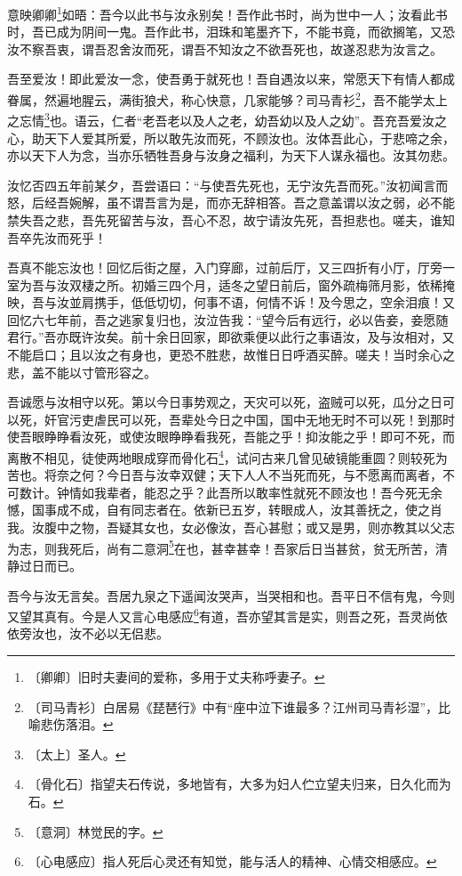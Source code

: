 \documentclass[12pt,UTF-8,openany]{ctexbook}
\begin{document}
\begin{normalsize}
    
    意映卿卿\footnote{〔卿卿〕旧时夫妻间的爱称，多用于丈夫称呼妻子。}如晤：吾今以此书与汝永别矣！吾作此书时，尚为世中一人；汝看此书时，吾已成为阴间一鬼。吾作此书，泪珠和笔墨齐下，不能书竟，而欲搁笔，又恐汝不察吾衷，谓吾忍舍汝而死，谓吾不知汝之不欲吾死也，故遂忍悲为汝言之。
    
    吾至爱汝！即此爱汝一念，使吾勇于就死也！吾自遇汝以来，常愿天下有情人都成眷属，然遍地腥云，满街狼犬，称心快意，几家能够？司马青衫\footnote{〔司马青衫〕白居易《琵琶行》中有“座中泣下谁最多？江州司马青衫湿”，比喻悲伤落泪。}，吾不能学太上之忘情\footnote{〔太上〕圣人。}也。语云，仁者“老吾老以及人之老，幼吾幼以及人之幼”。吾充吾爱汝之心，助天下人爱其所爱，所以敢先汝而死，不顾汝也。汝体吾此心，于悲啼之余，亦以天下人为念，当亦乐牺牲吾身与汝身之福利，为天下人谋永福也。汝其勿悲。
    
    汝忆否四五年前某夕，吾尝语曰：“与使吾先死也，无宁汝先吾而死。”汝初闻言而怒，后经吾婉解，虽不谓吾言为是，而亦无辞相答。吾之意盖谓以汝之弱，必不能禁失吾之悲，吾先死留苦与汝，吾心不忍，故宁请汝先死，吾担悲也。嗟夫，谁知吾卒先汝而死乎！
    
    吾真不能忘汝也！回忆后街之屋，入门穿廊，过前后厅，又三四折有小厅，厅旁一室为吾与汝双棲之所。初婚三四个月，适冬之望日前后，窗外疏梅筛月影，依稀掩映，吾与汝並肩携手，低低切切，何事不语，何情不诉！及今思之，空余泪痕！又回忆六七年前，吾之逃家复归也，汝泣告我：“望今后有远行，必以告妾，妾愿随君行。”吾亦既许汝矣。前十余日回家，即欲乘便以此行之事语汝，及与汝相对，又不能启口；且以汝之有身也，更恐不胜悲，故惟日日呼酒买醉。嗟夫！当时余心之悲，盖不能以寸管形容之。
    
    吾诚愿与汝相守以死。第以今日事势观之，天灾可以死，盗贼可以死，瓜分之日可以死，奸官污吏虐民可以死，吾辈处今日之中国，国中无地无时不可以死！到那时使吾眼睁睁看汝死，或使汝眼睁睁看我死，吾能之乎！抑汝能之乎！即可不死，而离散不相见，徒使两地眼成穿而骨化石\footnote{〔骨化石〕指望夫石传说，多地皆有，大多为妇人伫立望夫归来，日久化而为石。}，试问古来几曾见破镜能重圆？则较死为苦也。将奈之何？今日吾与汝幸双健；天下人人不当死而死，与不愿离而离者，不可数计。钟情如我辈者，能忍之乎？此吾所以敢率性就死不顾汝也！吾今死无余憾，国事成不成，自有同志者在。依新已五岁，转眼成人，汝其善抚之，使之肖我。汝腹中之物，吾疑其女也，女必像汝，吾心甚慰；或又是男，则亦教其以父志为志，则我死后，尚有二意洞\footnote{〔意洞〕林觉民的字。}在也，甚幸甚幸！吾家后日当甚贫，贫无所苦，清静过日而已。
    
    吾今与汝无言矣。吾居九泉之下遥闻汝哭声，当哭相和也。吾平日不信有鬼，今则又望其真有。今是人又言心电感应\footnote{〔心电感应〕指人死后心灵还有知觉，能与活人的精神、心情交相感应。}有道，吾亦望其言是实，则吾之死，吾灵尚依依旁汝也，汝不必以无侣悲。
    

\end{normalsize}
\end{document}
